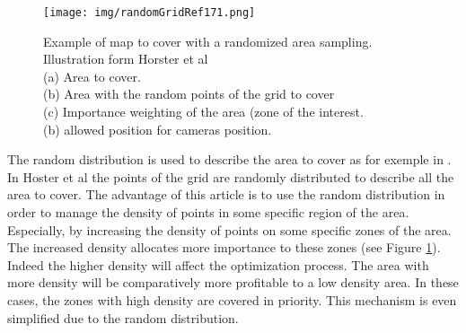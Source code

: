 \begin{figure}[t!]
\begin{center}
   \texttt{[image: img/randomGridRef171.png]}
  \caption{Example of  map to cover with a randomized area sampling. Illustration form Horster et al \citep{171*horster2006} \\
  (a) Area  to cover.\\ 
  (b) Area with the random points of the grid to cover \\
  (c) Importance weighting of the area (zone of the interest.\\  
  (b) allowed position for cameras position.}\label{fig:randomGridRef171}
  \endminipage\hfill
  \end{center}
\end{figure}

 The random distribution is used to describe the area to cover as  for exemple in \cite{83*van2009,171*horster2006}. \\
In Hoster et al \citep{171*horster2006} the points of the grid are randomly distributed to describe all the area to cover. The advantage of this article is to use the random distribution in order to manage the density of points in some specific region of the area. Especially, by increasing the density of points on some specific zones of the area. The increased density allocates more importance to these zones (see Figure \ref{fig:randomGridRef171}).\\
Indeed the higher density will affect the optimization process. The area with more density will be comparatively more profitable to a low density area. In these cases, the zones with high density are covered in priority. This mechanism is even simplified due to the random distribution.

